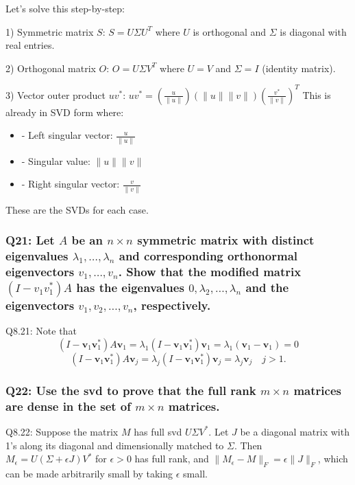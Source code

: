 \documentclass[8pt]{article}
\begin{document}
{{Let's solve this step-by-step:

1) Symmetric matrix $S$:
   $S = U\Sigma U^T$
   where $U$ is orthogonal and $\Sigma$ is diagonal with real entries.

2) Orthogonal matrix $O$:
   $O = U\Sigma V^T$
   where $U = V$ and $\Sigma = I$ (identity matrix).

3) Vector outer product $uv^*$:
   $uv^* = (\frac{u}{\|u\|})(\|u\|\|v\|)(\frac{v^*}{\|v\|})^T$
   This is already in SVD form where:
   \begin{itemize}
       \item - Left singular vector: $\frac{u}{\|u\|}$
       \item - Singular value: $\|u\|\|v\|$
       \item - Right singular vector: $\frac{v}{\|v\|}$
   \end{itemize}

These are the SVDs for each case.

\subsubsection*{Q21: Let \( A \) be an \( n \times n \) symmetric matrix with distinct eigenvalues \( \lambda_1, \ldots, \lambda_n \) and corresponding orthonormal eigenvectors \( v_1, \ldots, v_n \). Show that the modified matrix \( (I - v_1 v_1^*) A \) has the eigenvalues \( 0, \lambda_2, \ldots, \lambda_n \) and the eigenvectors \( v_1, v_2, \ldots, v_n \), respectively.}

Q8.21: Note that
\[
(I - \mathbf{v}_1 \mathbf{v}_1^*) A \mathbf{v}_1 = \lambda_1 (I - \mathbf{v}_1 \mathbf{v}_1^*) \mathbf{v}_1 = \lambda_1 (\mathbf{v}_1 - \mathbf{v}_1) = 0
\]
\[
(I - \mathbf{v}_1 \mathbf{v}_1^*) A \mathbf{v}_j = \lambda_j (I - \mathbf{v}_1 \mathbf{v}_1^*) \mathbf{v}_j = \lambda_j \mathbf{v}_j \quad j > 1.
\]

\subsubsection*{Q22: Use the svd to prove that the full rank \( m \times n \) matrices are dense in the set of \( m \times n \) matrices.}

Q8.22: Suppose the matrix \( M \) has full svd \( U \Sigma V^* \). Let \( J \) be a diagonal matrix with 1’s along its diagonal and dimensionally matched to \( \Sigma \). Then \( M_\epsilon = U(\Sigma + \epsilon J)V^* \) for \( \epsilon > 0 \) has full rank, and \( \| M_\epsilon - M \|_F = \epsilon \| J \|_F \), which can be made arbitrarily small by taking \( \epsilon \) small.

}}
\end{document}
